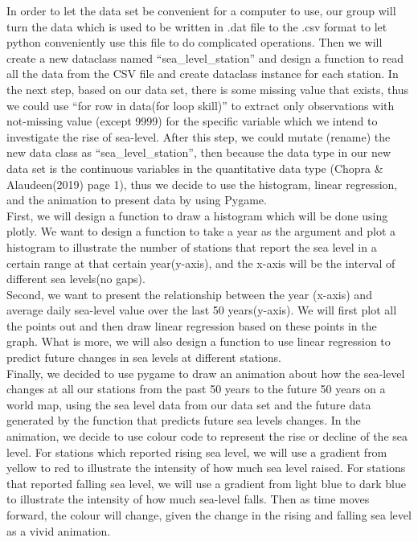 \documentclass[fontsize=11pt]{article}
\begin{document}
In order to let the data set be convenient for a computer to use, our group will turn the data which is used to be written in .dat file to the .csv format to let python conveniently use this file to do complicated operations. Then we will create a new dataclass named “sea\_level\_station” and design a function to read all the data from the CSV file and create dataclass instance for each station. In the next step, based on our data set, there is some missing value that exists, thus we could use “for row in data(for loop skill)” to extract only observations with not-missing value (except 9999) for the specific variable which we intend to investigate the rise of sea-level. After this step, we could mutate (rename) the new data class as “sea\_level\_station”, then because the data type in our new data set is the continuous variables in the quantitative data type (Chopra \& Alaudeen(2019) page 1), thus we decide to use the histogram, linear regression, and the animation to present data by using Pygame.\\
First, we will design a function to draw a histogram which will be done using plotly. We want to design a function to take a year as the argument and plot a histogram to illustrate the number of stations that report the sea level in a certain range at that certain year(y-axis), and the x-axis will be the interval of different sea levels(no gaps). \\
Second, we want to present the relationship between the year (x-axis) and average daily sea-level value over the last 50 years(y-axis). We will first plot all the points out and then draw linear regression based on these points in the graph. What is more, we will also design a function to use linear regression to predict future changes in sea levels at different stations. \\
Finally, we decided to use pygame to draw an animation about how the sea-level changes at all our stations from the past 50 years to the future 50 years on a world map, using the sea level data from our data set and the future data generated by the function that predicts future sea levels changes. In the animation, we decide to use colour code to represent the rise or decline of the sea level. For stations which reported rising sea level, we will use a gradient from yellow to red to illustrate the intensity of how much sea level raised. For stations that reported falling sea level, we will use a gradient from light blue to dark blue to illustrate the intensity of how much sea-level falls. Then as time moves forward, the colour will change, given the change in the rising and falling sea level as a vivid animation.\\
\end{document}
